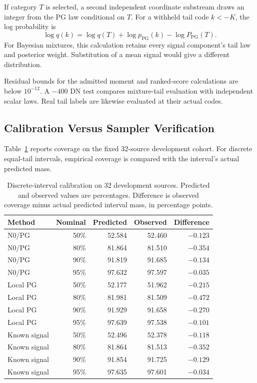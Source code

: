 \documentclass[10pt,twocolumn,journal]{IEEEtran}
\begin{document}
If category $T$ is selected, a second independent coordinate substream draws an integer from the PG law conditional on $T$. For a withheld tail code $k<-K$, the log probability is
\begin{equation}
\log q(k)=\log q(T)+\log p_{\mathrm{PG}}(k)-\log P_{\mathrm{PG}}(T).
\end{equation}
For Bayesian mixtures, this calculation retains every signal component's tail law and posterior weight. Substitution of a mean signal would give a different distribution.

Residual bounds for the admitted moment and ranked-score calculations are below $10^{-12}$. A $-400$ DN test compares mixture-tail evaluation with independent scalar laws. Real tail labels are likewise evaluated at their actual codes.

\subsection{Calibration Versus Sampler Verification}
Table~\ref{tab:coverage} reports coverage on the fixed 32-source development cohort. For discrete equal-tail intervals, empirical coverage is compared with the interval's actual predicted mass.

\begin{table}[t]
\centering
\caption{Discrete-interval calibration on 32 development sources. Predicted and observed values are percentages. Difference is observed coverage minus actual predicted interval mass, in percentage points.}
\label{tab:coverage}
\footnotesize
\setlength{\tabcolsep}{3pt}
\begin{tabular}{@{}lrrrr@{}}
\toprule
Method & Nominal & Predicted & Observed & Difference\\
\midrule
N0/PG & 50\% & 52.584 & 52.460 & $-0.123$\\
N0/PG & 80\% & 81.864 & 81.510 & $-0.354$\\
N0/PG & 90\% & 91.819 & 91.685 & $-0.134$\\
N0/PG & 95\% & 97.632 & 97.597 & $-0.035$\\
Local PG & 50\% & 52.177 & 51.962 & $-0.215$\\
Local PG & 80\% & 81.981 & 81.509 & $-0.472$\\
Local PG & 90\% & 91.929 & 91.658 & $-0.270$\\
Local PG & 95\% & 97.639 & 97.538 & $-0.101$\\
Known signal & 50\% & 52.496 & 52.378 & $-0.118$\\
Known signal & 80\% & 81.864 & 81.513 & $-0.352$\\
Known signal & 90\% & 91.854 & 91.725 & $-0.129$\\
Known signal & 95\% & 97.635 & 97.601 & $-0.034$\\
\bottomrule
\end{tabular}
\end{table}
\end{document}
